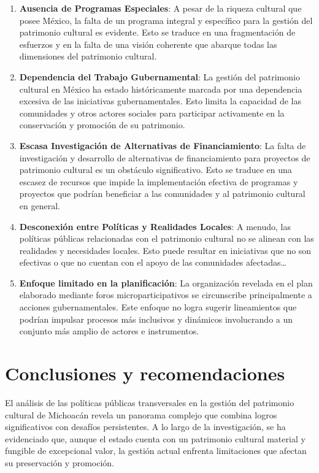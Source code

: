 \documentclass[
  spanish,
  11pt,
  a4paper,
]{scrbook}
\providecommand{\tightlist}{%
  \setlength{\itemsep}{0pt}\setlength{\parskip}{0pt}}
\begin{document}
\begin{enumerate}
\def\labelenumi{\arabic{enumi}.}
\tightlist
\item
  \textbf{Ausencia de Programas Especiales}: A pesar de la riqueza
  cultural que posee México, la falta de un programa integral y
  específico para la gestión del patrimonio cultural es evidente. Esto
  se traduce en una fragmentación de esfuerzos y en la falta de una
  visión coherente que abarque todas las dimensiones del patrimonio
  cultural.
\item
  \textbf{Dependencia del Trabajo Gubernamental}: La gestión del
  patrimonio cultural en México ha estado históricamente marcada por una
  dependencia excesiva de las iniciativas gubernamentales. Esto limita
  la capacidad de las comunidades y otros actores sociales para
  participar activamente en la conservación y promoción de su
  patrimonio.
\item
  \textbf{Escasa Investigación de Alternativas de Financiamiento}: La
  falta de investigación y desarrollo de alternativas de financiamiento
  para proyectos de patrimonio cultural es un obstáculo significativo.
  Esto se traduce en una escasez de recursos que impide la
  implementación efectiva de programas y proyectos que podrían
  beneficiar a las comunidades y al patrimonio cultural en general.
\item
  \textbf{Desconexión entre Políticas y Realidades Locales}: A menudo,
  las políticas públicas relacionadas con el patrimonio cultural no se
  alinean con las realidades y necesidades locales. Esto puede resultar
  en iniciativas que no son efectivas o que no cuentan con el apoyo de
  las comunidades afectadas\ldots{}
\item
  \textbf{Enfoque limitado en la planificación}: La organización
  revelada en el plan elaborado mediante foros microparticipativos se
  circunscribe principalmente a acciones gubernamentales. Este enfoque
  no logra sugerir lineamientos que podrían impulsar procesos más
  inclusivos y dinámicos involucrando a un conjunto más amplio de
  actores e instrumentos.
\end{enumerate}

\section*{Conclusiones y
recomendaciones}\label{conclusiones-y-recomendaciones}


El análisis de las políticas públicas transversales en la gestión del
patrimonio cultural de Michoacán revela un panorama complejo que combina
logros significativos con desafíos persistentes. A lo largo de la
investigación, se ha evidenciado que, aunque el estado cuenta con un
patrimonio cultural material y fungible de excepcional valor, la gestión
actual enfrenta limitaciones que afectan su preservación y promoción.
\end{document}
